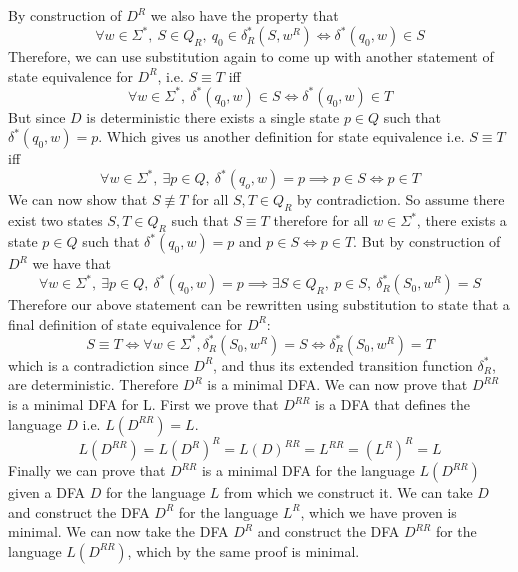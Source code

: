 \documentclass[12pt]{article}
\begin{document}
By construction of $D^R$ we also have the property that
$$ \forall w \in \Sigma^*,\ S \in Q_R,\ q_0 \in \delta_R^*(S, w^R) \iff
\delta^*(q_0, w) \in S$$
Therefore, we can use substitution again to come up with another statement
of state equivalence for $D^R$, i.e. $ S \equiv T$ iff
$$ \forall w \in \Sigma^*,\ \delta^*(q_0, w) \in S \iff \delta^*(q_0, w) \in T$$
But since $D$ is deterministic there exists a single state $p \in Q$ such
that $\delta^*(q_0, w) = p$. Which gives us another definition for state
equivalence i.e. $S \equiv T$ iff
$$ \forall w \in \Sigma^*,\ \exists p \in Q,\ \delta^*(q_o,w) = p \implies
p \in S \iff p \in T$$
We can now show that $S \not\equiv T$ for all $S,T \in Q_R$ by contradiction.
So assume there exist two states $S,T \in Q_R$ such that $S \equiv T$ therefore
for all $w \in \Sigma^*$, there exists a state $p \in Q$ such that
$\delta^*(q_0,w) = p$ and $p \in S \iff p \in T$. But by construction of $D^R$
we have that
$$\forall w \in \Sigma^*,\ \exists p \in Q,\ \delta^*(q_0, w) = p \implies
\exists S \in Q_R,\ p \in S,\ \delta_R^*(S_0, w^R) = S$$
Therefore our above statement can be rewritten using substitution to state that
a final definition of state equivalence for $D^R$:
$$ S \equiv T \iff \forall w \in \Sigma^*,
\delta_R^*(S_0, w^R) = S \iff \delta_R^*(S_0, w^R) = T$$
which is a contradiction since $D^R$, and thus its extended transition function
$\delta_R^*$, are deterministic. Therefore $D^R$ is a minimal DFA.
\medskip
\newline
We can now prove that $D^{RR}$ is a minimal DFA for L. First we prove
that $D^{RR}$ is a DFA that defines the language $D$ i.e. $L(D^{RR}) = L$.
$$L(D^{RR}) = L(D^R)^R = L(D)^{RR} = L^{RR} = (L^R)^R = L$$
Finally we can prove that $D^{RR}$ is a minimal DFA for the language $L(D^{RR})$
given a DFA $D$ for the language $L$ from which we construct it. We can take
$D$ and construct the DFA $D^R$ for the language $L^R$, which we have proven is
minimal. We can now take the DFA $D^R$ and construct the DFA $D^{RR}$ for
the language $L(D^{RR})$, which by the same proof is minimal.
\end{document}
